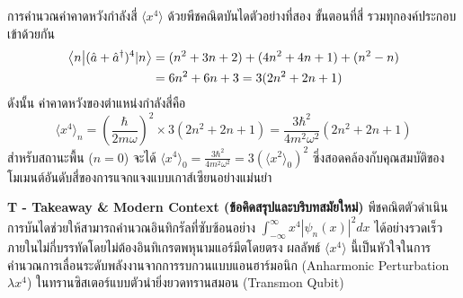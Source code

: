 \begin{psctbox}{การคำนวณค่าคาดหวังกำลังสี่ $\langle x^4 \rangle$ ด้วยพีชคณิตบันได}{ตัวอย่างที่สอง}
ขั้นตอนที่สี่ รวมทุกองค์ประกอบเข้าด้วยกัน
\begin{align}
\braket{n}{(\hat{a} + \hat{a}^\dagger)^4|n} &= (n^2 + 3n + 2) + (4n^2 + 4n + 1) + (n^2 - n) \nonumber \\
&= 6n^2 + 6n + 3 = 3(2n^2 + 2n + 1)
\end{align}
ดังนั้น ค่าคาดหวังของตำแหน่งกำลังสี่คือ
\begin{equation}
\langle x^4 \rangle_n = \left(\frac{\hbar}{2m\omega}\right)^2 \times 3(2n^2 + 2n + 1) = \frac{3\hbar^2}{4m^2\omega^2}(2n^2 + 2n + 1)
\end{equation}
สำหรับสถานะพื้น ($n = 0$) จะได้ $\langle x^4 \rangle_0 = \frac{3\hbar^2}{4m^2\omega^2} = 3(\langle x^2 \rangle_0)^2$ ซึ่งสอดคล้องกับคุณสมบัติของโมเมนต์อันดับสี่ของการแจกแจงแบบเกาส์เซียนอย่างแม่นยำ

\vspace{6pt}
\noindent\textbf{T - Takeaway \& Modern Context (ข้อคิดสรุปและบริบทสมัยใหม่)} พีชคณิตตัวดำเนินการบันไดช่วยให้สามารถคำนวณอินทิกรัลที่ซับซ้อนอย่าง $\int_{-\infty}^\infty x^4 |\psi_n(x)|^2 dx$ ได้อย่างรวดเร็วภายในไม่กี่บรรทัดโดยไม่ต้องอินทิเกรตพหุนามแอร์มีตโดยตรง ผลลัพธ์ $\langle x^4 \rangle$ นี้เป็นหัวใจในการคำนวณการเลื่อนระดับพลังงานจากการรบกวนแบบแอนฮาร์มอนิก (Anharmonic Perturbation $\lambda x^4$) ในทรานซิสเตอร์แบบตัวนำยิ่งยวดทรานสมอน (Transmon Qubit)
\end{psctbox}

